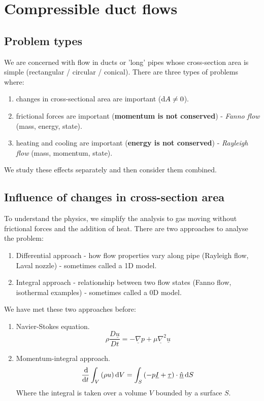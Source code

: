 \documentclass[class=report, crop=false, 12pt,a4paper]{standalone}
\begin{document}
\section{Compressible duct flows}
\subsection{Problem types}
We are concerned with flow in ducts or 'long' pipes whose cross-section area is simple (rectangular / circular / conical). There are three types of problems where:
\begin{enumerate}
    \item changes in cross-sectional area are important ($\dif A \neq 0$).
    \item frictional forces are important (\textbf{momentum is not conserved}) - \textit{Fanno flow} (mass, energy, state).
    \item heating and cooling are important (\textbf{energy is not conserved}) - \textit{Rayleigh flow} (mass, momentum, state).
\end{enumerate}
We study these effects separately and then consider them combined.
\subsection{Influence of changes in cross-section area}
To understand the physics, we simplify the analysis to gas moving without frictional forces and the addition of heat. There are two approaches to analyse the problem:
\begin{enumerate}
    \item Differential approach - how flow properties vary along pipe (Rayleigh flow, Laval nozzle) - sometimes called a 1D model.
    \item Integral approach - relationship between two flow states (Fanno flow, isothermal examples) - sometimes called a 0D model.
\end{enumerate}
We have met these two approaches before:
\begin{enumerate}
    \item Navier-Stokes equation. $$\rho \dfrac{D\underline{u}}{Dt} = - \underline{\nabla} p + \mu \underline{\nabla}^2 \underline{u}$$
    \item Momentum-integral approach. $$\dfrac{\dif}{\dif t} \int_V \left(\rho u\right)\dif V = \int_S \left(-p\underline{I} + \underline{\tau}\right)\cdot \underline{\hat{n}}\dif S$$ Where the integral is taken over a volume $V$ bounded by a surface $S$.
\end{enumerate}
\end{document}
